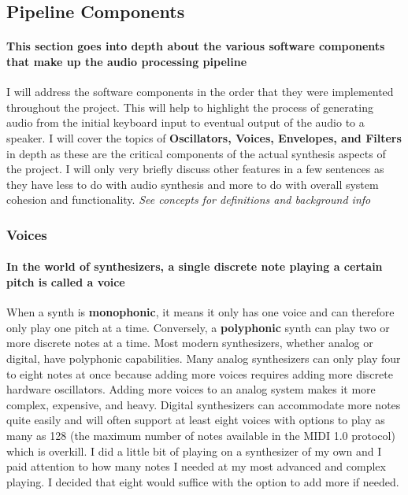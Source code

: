 \documentclass[acmlarge,screen]{acmart}
\begin{document}
\subsection{Pipeline Components}
	\paragraph{This section goes into depth about the various software components that make up the audio processing pipeline} I will address the software components in the order that they were implemented throughout the project. This will help to highlight the process of generating audio from the initial keyboard input to eventual output of the audio to a speaker. I will cover the topics of \textbf{Oscillators, Voices, Envelopes, and Filters} in depth as these are the critical components of the actual synthesis aspects of the project. I will only very briefly discuss other features in a few sentences as they have less to do with audio synthesis and more to do with overall system cohesion and functionality. \textit{See concepts for definitions and background info}

	

	\subsubsection{Voices}
	\paragraph{In the world of synthesizers, a single discrete note playing a certain pitch is called a voice} When a synth is \textbf{monophonic}, it means it only has one voice and can therefore only play one pitch at a time. Conversely, a \textbf{polyphonic} synth can play two or more discrete notes at a time. Most modern synthesizers, whether analog or digital, have polyphonic capabilities. Many analog synthesizers can only play four to eight notes at once because adding more voices requires adding more discrete hardware oscillators. Adding more voices to an analog system makes it more complex, expensive, and heavy. Digital synthesizers can accommodate more notes quite easily and will often support at least eight voices with options to play as many as 128 (the maximum number of notes available in the MIDI 1.0 protocol) which is overkill. I did a little bit of playing on a synthesizer of my own and I paid attention to how many notes I needed at my most advanced and complex playing. I decided that eight would suffice with the option to add more if needed.
	
\end{document}
